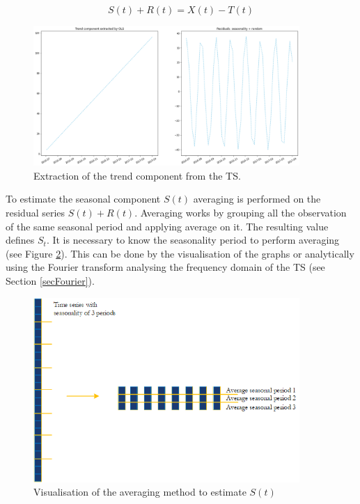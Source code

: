 \begin{equation}
S(t)+R(t)=X(t)-T(t)
\label{eq_extractedTrend}
\end{equation}

\begin{figure}[hbt!]
\centering
\includegraphics[width=0.9\textwidth]{SectionLetsMath/elemStat_figures/fig_extractedTrend.png}
\captionsetup{type=figure}
\caption{Extraction of the trend component from the TS.}
\label{fig_extractedTrend}
\end{figure}

To estimate the seasonal component $S(t)$ averaging is performed on the residual series $S\left(t\right)+R(t)$. Averaging works by grouping all the observation of the same seasonal period and applying average on it. The resulting value defines $S_t$. It is necessary to know the seasonality period to perform averaging (see Figure \ref{fig_averaging}). This can be done by the visualisation of the graphs or analytically using the Fourier transform analysing the frequency domain of the TS (see Section \ref{secFourier}).

\begin{figure}[hbt!]
\centering
\includegraphics[width=0.9\textwidth]{SectionLetsMath/elemStat_figures/fig_averaging.png}
\captionsetup{type=figure}
\caption{Visualisation of the averaging method to estimate $S(t)$}
\label{fig_averaging}
\end{figure}

